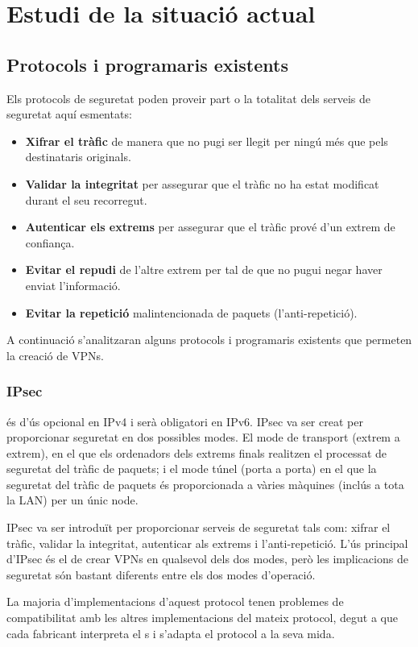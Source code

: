 \chapter{Estudi de la situació actual}
\section{Protocols i programaris existents}
Els protocols de seguretat poden proveir part o la totalitat dels serveis de seguretat aquí esmentats:
\begin{itemize}
\item \textbf{Xifrar el tràfic} de manera que no pugi ser llegit per ningú més que pels destinataris originals.
\item \textbf{Validar la integritat} per assegurar que el tràfic no ha estat modificat durant el seu recorregut.
\item \textbf{Autenticar els extrems} per assegurar que el tràfic prové d'un extrem de confiança.
\item \textbf{Evitar el repudi} de l'altre extrem per tal de que no pugui negar haver enviat l'informació.
\item \textbf{Evitar la repetició} malintencionada de paquets (l'anti-repetició).
\end{itemize}

A continuació s'analitzaran alguns protocols i programaris existents que permeten la creació de VPNs.
\subsection{IPsec}
 és d'ús opcional en IPv4 i serà obligatori en IPv6. IPsec va ser creat per proporcionar seguretat en dos possibles modes. El mode de transport (extrem a extrem), en el que els ordenadors dels extrems finals realitzen el processat de seguretat del tràfic de paquets; i el mode túnel (porta a porta) en el que la seguretat del tràfic de paquets és proporcionada a vàries màquines (inclús a tota la LAN) per un únic node.

IPsec va ser introduït per proporcionar serveis de seguretat tals com: xifrar el tràfic, validar la integritat, autenticar als extrems i l'anti-repetició. L'ús principal d'IPsec és el de crear VPNs en qualsevol dels dos modes, però les implicacions de seguretat són bastant diferents entre els dos modes d'operació.

La majoria d'implementacions d'aquest protocol tenen problemes de compatibilitat amb les altres implementacions del mateix protocol, degut a que cada fabricant interpreta el \rfckeyword{}s i s'adapta el protocol a la seva mida.

